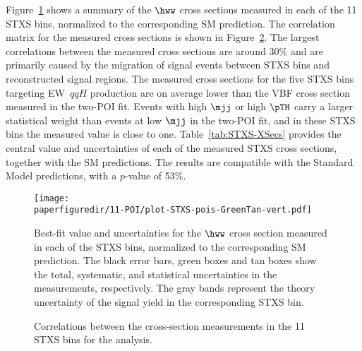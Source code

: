 
Figure~\ref{fig:11-POI_measurement} shows a summary of the $\hww$ cross sections measured in each of the 11 STXS bins, normalized to the corresponding SM prediction. The correlation matrix for the measured cross sections is shown in Figure~\ref{fig:STXS-correlation}.
The largest correlations between the measured cross sections are around 30\% and are primarily caused by the migration of signal events between STXS bins and reconstructed signal regions.
The measured cross sections for the five STXS bins targeting EW~$qqH$ production are on average lower than the VBF cross section measured in the two-POI fit.
Events with high $\mjj$ or high $\pTH$ carry a larger statistical weight than events at low $\mjj$ in the two-POI fit, and in these STXS bins the measured value is close to one.
Table~\ref{tab:STXS-XSecs} provides the central value and uncertainties of each of the measured STXS cross sections, together with the SM predictions.
The results are compatible with the Standard Model predictions, with a $p$-value of 53\%.

\begin{figure}[htb]
\centering
  \texttt{[image: \\paperfiguredir/11-POI/plot-STXS-pois-GreenTan-vert.pdf]}
  \caption{
    Best-fit value and uncertainties for the $\hww$ cross section measured in each of the STXS bins, normalized to the corresponding SM prediction.
    The black error bars, green boxes and tan boxes show the total, systematic, and statistical uncertainties in the measurements, respectively.
    The gray bands represent the theory uncertainty of the signal yield in the corresponding STXS bin.
    \label{fig:11-POI_measurement}
  }
\end{figure}


\begin{figure}[htb]
\centering
\scalebox{0.9}{

}
\caption{
  Correlations between the cross-section measurements in the 11 STXS bins for the \hwwenmn analysis.
  \label{fig:STXS-correlation}
}
\end{figure}




